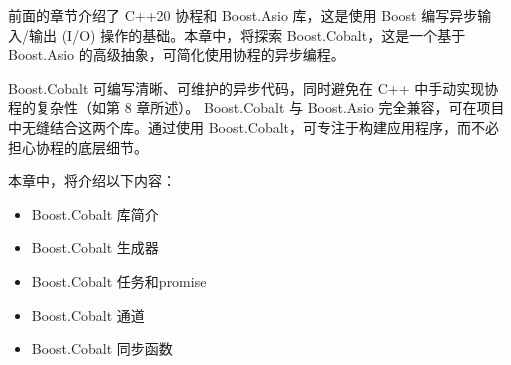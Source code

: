 前面的章节介绍了 C++20 协程和 Boost.Asio 库，这是使用 Boost 编写异步输入/输出 (I/O) 操作的基础。本章中，将探索 Boost.Cobalt，这是一个基于 Boost.Asio 的高级抽象，可简化使用协程的异步编程。

Boost.Cobalt 可编写清晰、可维护的异步代码，同时避免在 C++ 中手动实现协程的复杂性（如第 8 章所述）。 Boost.Cobalt 与 Boost.Asio 完全兼容，可在项目中无缝结合这两个库。通过使用 Boost.Cobalt，可专注于构建应用程序，而不必担心协程的底层细节。

本章中，将介绍以下内容：

\begin{itemize}
\item
Boost.Cobalt 库简介

\item
Boost.Cobalt 生成器

\item
Boost.Cobalt 任务和promise

\item
Boost.Cobalt 通道

\item
Boost.Cobalt 同步函数
\end{itemize}












